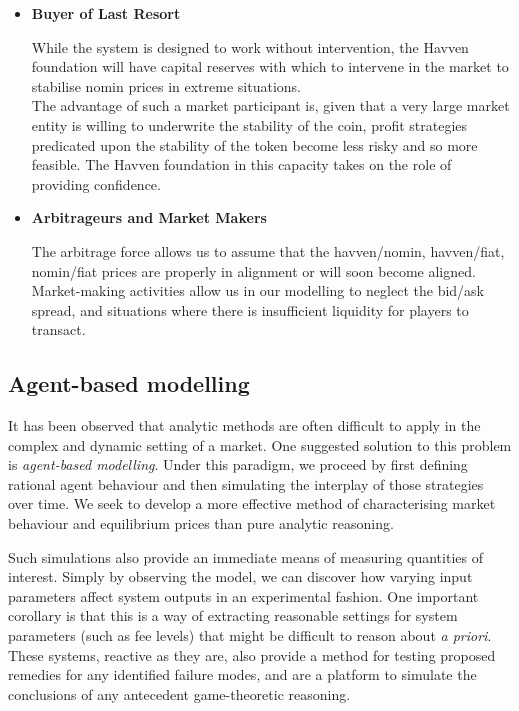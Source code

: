 \begin{itemize}
	

	\item[] \textbf{Buyer of Last Resort}
	
	While the system is designed to work without intervention, the Havven foundation
	will have capital reserves with which to intervene in the market to stabilise
	nomin prices in extreme situations. \\
	The advantage of such a market participant is, given that a very large market entity is
	willing to underwrite the stability of the coin, profit strategies predicated upon the
	stability of the token become less risky and so more feasible. The Havven foundation in
	this capacity takes on the role of providing confidence.

	\item[] \textbf{Arbitrageurs and Market Makers}

	The arbitrage force allows us to assume that the havven/nomin, havven/fiat, nomin/fiat
	prices are properly in alignment or will soon become aligned. Market-making activities
	allow us in our modelling to neglect the bid/ask spread, and situations where there is insufficient
	liquidity for players to transact.
	
\end{itemize}

\subsection{Agent-based modelling}
It has been observed that analytic methods are often difficult to
apply in the complex and dynamic setting of a market.
One suggested solution to this problem is \textit{agent-based modelling}.
Under this paradigm, we proceed by first defining rational agent behaviour
and then simulating the interplay of those strategies over time.
We seek to develop a more effective
method of characterising market behaviour and equilibrium prices than pure analytic reasoning.

\noindent Such simulations also provide an immediate means of measuring
quantities of interest. Simply by observing
the model, we can discover how varying input parameters
affect system outputs in an experimental fashion.
One important corollary is that this is a way of extracting reasonable
settings for system parameters (such as fee levels) that might be difficult
to reason about \textit{a priori}. These systems, reactive as they are,
also provide a method for testing proposed remedies for any identified failure
modes, and are a platform to simulate the conclusions of any antecedent game-theoretic
reasoning. \\

